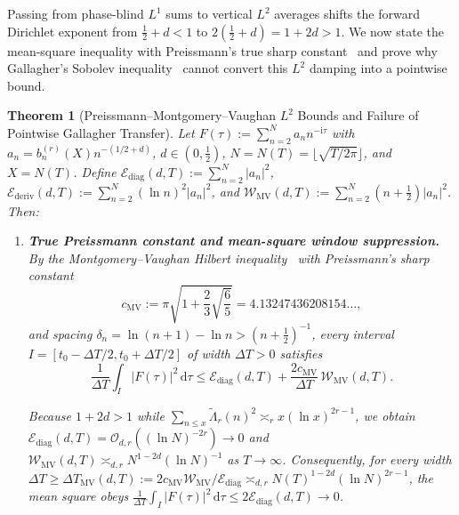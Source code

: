 \documentclass[11pt,reqno]{amsart}
\newtheorem{theorem}{Theorem}[section]
\theoremstyle{definition}
\theoremstyle{remark}
\numberwithin{equation}{section}
\newcommand{\dd}{\,\mathrm{d}}
\newcommand{\ii}{\mathrm{i}}
\begin{document}
Passing from phase-blind $L^1$ sums to vertical $L^2$ averages shifts the forward Dirichlet exponent from $\frac{1}{2} + d < 1$ to $2(\frac{1}{2} + d) = 1 + 2d > 1$. We now state the mean-square inequality with Preissmann's true sharp constant~\cite{preissmann1984} and prove why Gallagher's Sobolev inequality~\cite{gallagher1970} cannot convert this $L^2$ damping into a pointwise bound.

\begin{theorem}[Preissmann--Montgomery--Vaughan $L^2$ Bounds and Failure of Pointwise Gallagher Transfer]\label{thm:mv_gallagher}
Let $F(\tau) := \sum_{n=2}^{N} a_n n^{-\ii\tau}$ with $a_n = b_n^{(r)}(X)n^{-(1/2+d)}$, $d \in (0, \frac{1}{2})$, $N = N(T) = \lfloor\sqrt{T/2\pi}\rfloor$, and $X = N(T)$. Define $\mathcal{E}_{\mathrm{diag}}(d,T) := \sum_{n=2}^N \lvert a_n\rvert^2$, $\mathcal{E}_{\mathrm{deriv}}(d,T) := \sum_{n=2}^N (\ln n)^2\lvert a_n\rvert^2$, and $\mathcal{W}_{\mathrm{MV}}(d,T) := \sum_{n=2}^N (n + \frac{1}{2})\lvert a_n\rvert^2$. Then:
\begin{enumerate}[label=\textup{(\roman*)},leftmargin=2.2em]
\item \textbf{True Preissmann constant and mean-square window suppression.} By the Montgomery--Vaughan Hilbert inequality~\cite{montgomeryvaughan1974} with Preissmann's sharp constant~\cite{preissmann1984}
\begin{equation}\label{eq:preissmann_true}
c_{\mathrm{MV}} := \pi\sqrt{1 + \frac{2}{3}\sqrt{\frac{6}{5}}} = 4.13247436208154\dots,
\end{equation}
and spacing $\delta_n = \ln(n+1) - \ln n > (n + \frac{1}{2})^{-1}$, every interval $I = [t_0 - \Delta T/2, t_0 + \Delta T/2]$ of width $\Delta T > 0$ satisfies
\begin{equation}\label{eq:mv_window}
\frac{1}{\Delta T}\int_{I} \bigl\lvert F(\tau)\bigr\rvert^2\dd\tau \le \mathcal{E}_{\mathrm{diag}}(d,T) + \frac{2c_{\mathrm{MV}}}{\Delta T}\,\mathcal{W}_{\mathrm{MV}}(d,T).
\end{equation}
{\sloppy Because $1 + 2d > 1$ while $\sum_{n \le x}\widetilde{\Lambda}_r(n)^2 \asymp_r x(\ln x)^{2r-1}$, we obtain $\mathcal{E}_{\mathrm{diag}}(d,T) =\allowbreak \mathcal{O}_{d,r}((\ln N)^{-2r}) \to 0$ and $\mathcal{W}_{\mathrm{MV}}(d,T) \asymp_{d,r}\allowbreak N^{1-2d}(\ln N)^{-1}$ as $T \to \infty$. Consequently, for every width $\Delta T \ge \Delta T_{\mathrm{MV}}(d,T) :=\allowbreak 2c_{\mathrm{MV}}\mathcal{W}_{\mathrm{MV}}/\mathcal{E}_{\mathrm{diag}} \asymp_{d,r}\allowbreak N(T)^{1-2d}(\ln N)^{2r-1}$, the mean square obeys $\frac{1}{\Delta T}\int_I \lvert F(\tau)\rvert^2\dd\tau \le\allowbreak 2\mathcal{E}_{\mathrm{diag}}(d,T) \to 0$.\par}

\end{enumerate}
\end{theorem}
\end{document}
